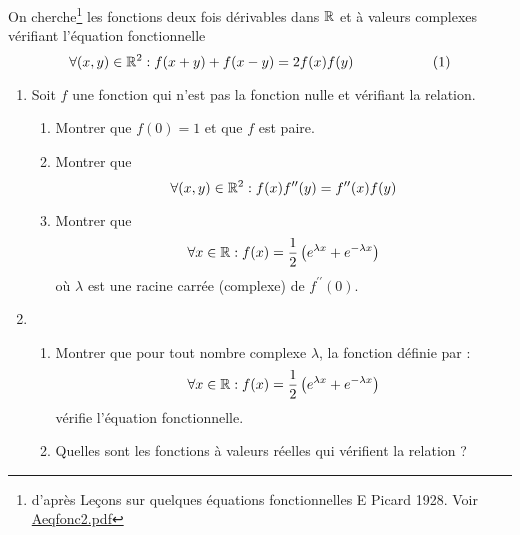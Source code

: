 On cherche\footnote{d'après Leçons sur quelques équations fonctionnelles E Picard 1928. Voir \href{\baseurl Aeqfonc2.pdf}{Aeqfonc2.pdf}} les fonctions deux fois dérivables dans $\mathbb{R}$ et à valeurs complexes vérifiant l'équation fonctionnelle
\begin{displaymath}
 \forall (x,y)\in\mathbb{R}^2 : f(x+y) + f(x-y) = 2f(x)f(y)\hspace{2cm}(1)
\end{displaymath}
\begin{enumerate}
 \item Soit $f$ une fonction qui n'est pas la fonction nulle et vérifiant la relation.
\begin{enumerate}
 \item Montrer que $f(0)=1$ et que $f$ est paire.
\item Montrer que 
\begin{displaymath}
 \forall(x,y)\in \mathbb{R}^2 : f(x)f^{\prime\prime}(y)=f^{\prime\prime}(x)f(y)
\end{displaymath}
\item Montrer que
\begin{displaymath}
 \forall x\in \mathbb{R} : f(x)=\dfrac{1}{2}\left( e^{\lambda x} + e^{-\lambda x}\right) 
\end{displaymath}
où $\lambda$ est une racine carrée (complexe) de $f^{\prime\prime}(0)$.
\end{enumerate}
\item \begin{enumerate}
 \item Montrer que pour tout nombre complexe $\lambda$, la fonction définie par :
\begin{displaymath}
 \forall x\in \mathbb{R} : f(x)=\dfrac{1}{2}\left( e^{\lambda x} + e^{-\lambda x}\right) 
\end{displaymath}
vérifie l'équation fonctionnelle.

\item Quelles sont les fonctions à valeurs réelles qui vérifient la relation ?
\end{enumerate}

\end{enumerate}

